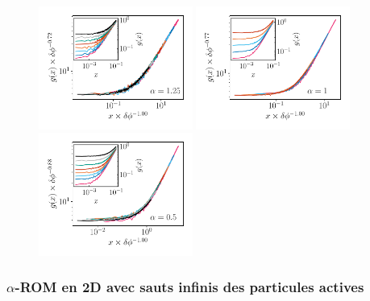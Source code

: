 \begin{figure}[h]
\includegraphics[width=0.45\textwidth]{Chapitre3/Figures/Interpretation/PCorrMF/PCorr_rescaled_MF_alpha125.pdf}
\includegraphics[width=0.45\textwidth]{Chapitre3/Figures/Interpretation/PCorrMF/PCorr_rescaled_MF_alpha1.pdf}
\includegraphics[width=0.45\textwidth]{Chapitre3/Figures/Interpretation/PCorrMF/PCorr_rescaled_MF_alpha05.pdf}
\caption{}
\label{fig:annexePcorrAlphaMF}
\end{figure}

\subsubsection{$\alpha$-ROM en 2D avec sauts infinis des particules actives}

